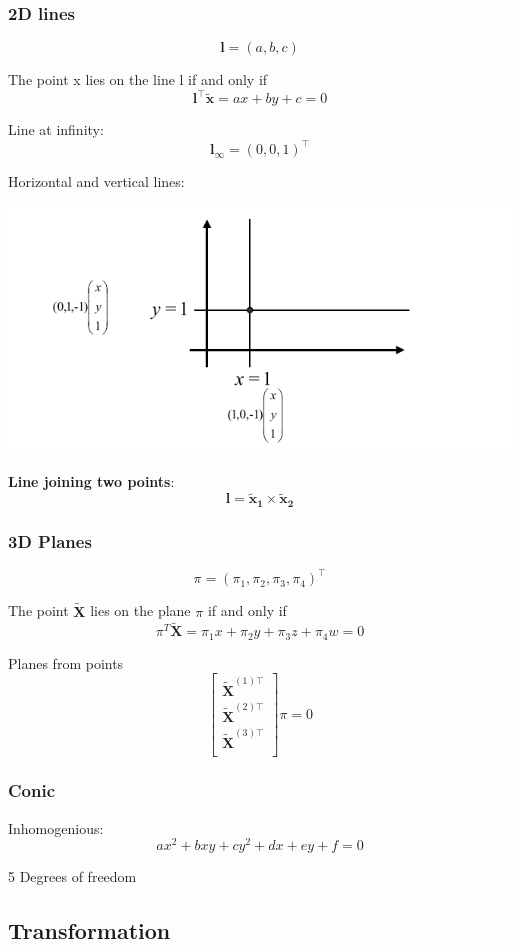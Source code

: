 \subsubsection{2D lines}

$$ \bm{l} = (a,b,c) $$

The point x lies on the line l if and only if
$$ \bm{l}^\top\tilde{\bm{x}} = ax+by+c=0$$

Line at infinity:
$$\bm{l}_\infty = (0,0,1)^\top$$

Horizontal and vertical lines:

\includegraphics[width=0.8\columnwidth]{pictures/verticalhorizontal}

\textbf{Line joining two points}:
$$ \bm{l} = \bm{\tilde{x}_1} \times \bm{\tilde{x}_2} $$

\subsubsection{3D Planes}

$$ \pi = (\pi_1,\pi_2,\pi_3,\pi_4)^\top $$

The point $\bm{\tilde{X}}$ lies on the plane $\pi$ if and only if
$$ \pi^T\bm{\tilde{X}} = \pi_1x+\pi_2y+\pi_3z+\pi_4w = 0 $$

Planes from points
$$ \begin{bmatrix}
	\tilde{\bm{X}}^{(1)\top}\\
	\tilde{\bm{X}}^{(2)\top}\\
	\tilde{\bm{X}}^{(3)\top}\\
\end{bmatrix} \pi = 0 $$


\subsubsection{Conic}
Inhomogenious:
$$ ax^2 + bxy + cy^2 + dx + ey + f = 0$$

5 Degrees of freedom

\subsection{Transformation}
